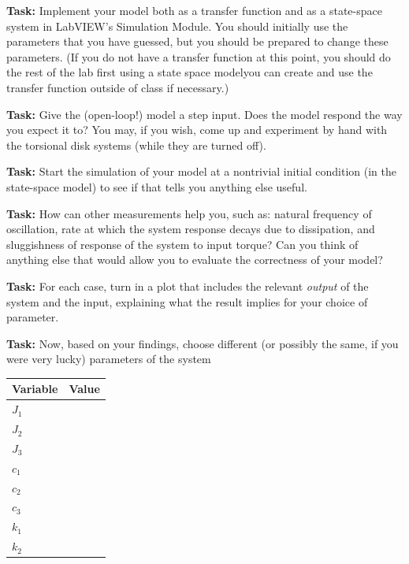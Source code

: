 \noindent \textbf{Task:} Implement your model both as a transfer function 
and as a state-space system in LabVIEW's Simulation Module.  You should
initially use the parameters that you have guessed, but you should be prepared
to change these parameters.  (If you do not have a transfer function at this
point, you should do the rest of the lab first using a state space model\textendash you can
create and use the transfer function outside of class if necessary.)

\noindent \textbf{Task:} Give the (open-loop!) model a step input.  Does the
model respond the way you expect it to?  You may, if you wish, come up and
experiment by hand with the torsional disk systems (while they are turned off).

\noindent \textbf{Task:} Start the simulation of your model at a
nontrivial initial condition (in the state-space model) to see if that tells you
anything else useful.  

\noindent \textbf{Task:} How can other measurements help you, such as:  
natural frequency of oscillation, rate at which the system response decays due
to dissipation, and sluggishness of response of the system to input torque?  Can
you think of anything else that would allow you to evaluate the correctness of
your model?

\noindent \textbf{Task:} For each case, turn in a plot that includes the
relevant \emph{output} of the system and the input, explaining what the result
implies for your choice of parameter.  

\begin{center}
\end{center}

\noindent \textbf{Task:} Now, based on your findings, choose different 
(or possibly the same, if you were very lucky) parameters of the system
\begin{center}
\begin{tabular}{||l|l||}
\hline
Variable & \hspace{2in}Value \\
\hline
$J_1$ & \\
\hline
$J_2$ & \\
\hline
$J_3$ & \\
\hline
$c_1$ & \\
\hline
$c_2$ & \\
\hline
$c_3$ & \\
\hline
$k_1$ & \\
\hline
$k_2$ & \\
\hline
\end{tabular}
\end{center}


